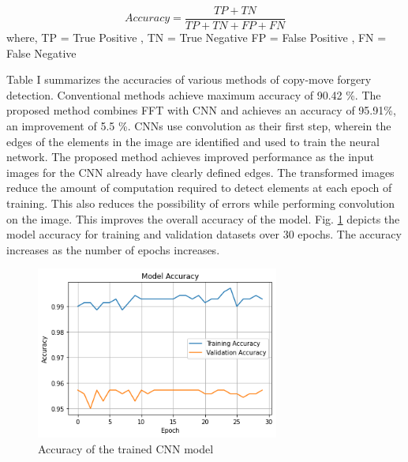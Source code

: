 \documentclass[conference]{IEEEtran}
\begin{document}
\begin{equation}
   Accuracy = \frac{TP +TN}{TP +TN + FP +FN}
\end{equation}
where,
\newline
TP = True Positive , TN = True Negative \newline
FP = False Positive , FN = False Negative  

\begin{table}[htpb]
\centering
\caption{\label{tab:acc}Accuracies of various detection methods}
\end{table}

Table I summarizes the accuracies of various methods of copy-move forgery detection. Conventional methods achieve maximum accuracy of 90.42 \%. The proposed method combines FFT with CNN and achieves an accuracy of 95.91\%, an improvement of 5.5 \%. CNNs use convolution as their first step, wherein the edges of the elements in the image are identified and used to train the neural network. The proposed method achieves improved performance as the input images for the CNN already have clearly defined edges. The transformed images reduce the amount of computation required to detect elements at each epoch of training. This also reduces the possibility of errors while performing convolution on the image. This improves the overall accuracy of the model. Fig. \ref{accuracy} depicts the model accuracy for training and validation datasets over 30 epochs. The accuracy increases as the number of epochs increases.

\begin{figure}[htpb]
\centerline{\includegraphics[width=8cm]{accuracy.png}}
\caption{Accuracy of the trained CNN model}
\label{accuracy}
\end{figure}
\end{document}
